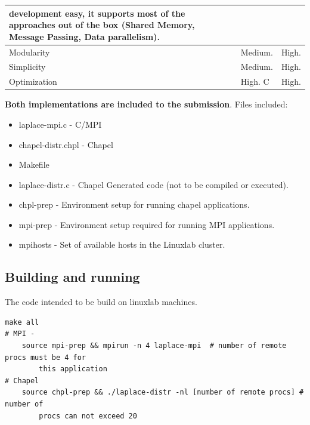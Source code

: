 \documentclass{article}
\begin{document}
\begin{centering}
\begin{table}[h!]
\begin{tabular}{l| p{7.5cm} | p{7.5cm}}
                  development easy, it supports most of the approaches out of the box (Shared
                  Memory, Message Passing, Data parallelism).
                  \\ \hline
              Modularity 
                  & Medium. 
                  & High. 
                  \\ \hline
              Simplicity 
                  & Medium. 
                  & High. 
                  \\ \hline
              Optimization 
                  & High. C 
                  & High. 
                  \\ \hline


            \end{tabular}
        \end{table}
        \end{centering}

        \textbf{Both implementations are included to the submission}. Files included: 

        \begin{itemize}
            \item laplace-mpi.c - C/MPI
            \item chapel-distr.chpl - Chapel
            \item Makefile
            \item laplace-distr.c - Chapel Generated code (not to be compiled or executed).
            \item chpl-prep - Environment setup for running chapel applications.
            \item mpi-prep - Environment setup required for running MPI applications.
            \item mpihosts - Set of available hosts in the Linuxlab cluster.
        \end{itemize}
        \subsection{Building and running}
        
        The code intended to be build on linuxlab machines.
        \begin{lstlisting}
make all
# MPI -
    source mpi-prep && mpirun -n 4 laplace-mpi  # number of remote procs must be 4 for 
        this application
# Chapel
    source chpl-prep && ./laplace-distr -nl [number of remote procs] # number of 
        procs can not exceed 20 
        \end{lstlisting}



\end{document}
